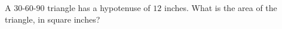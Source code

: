 A $30$-$60$-$90$ triangle has a hypotenuse of $12$ inches. What is the area of the triangle, in square inches?
